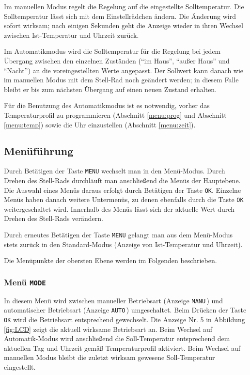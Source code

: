 \documentclass[a4paper]{article}
\begin{document}
Im manuellen Modus regelt die Regelung auf die eingestellte Solltemperatur.
Die Solltemperatur lässt sich mit dem Einstellrädchen ändern.  Die
Änderung wird sofort wirksam; nach einigen Sekunden geht die Anzeige
wieder in ihren Wechsel zwischen Ist-Temperatur und Uhrzeit zurück.

Im Automatikmodus wird die Solltemperatur für die Regelung bei jedem
Übergang zwischen den einzelnen Zuständen ("`im Haus"', "`außer Haus"'
und "`Nacht"') an die voreingestellten Werte angepasst.  Der Sollwert
kann danach wie im manuellen Modus mit dem Stell-Rad noch geändert
werden; in diesem Falle bleibt er bis zum nächsten Übergang auf einen
neuen Zustand erhalten.

Für die Benutzung des Automatikmodus ist es notwendig, vorher das
Temperaturprofil zu programmieren (Abschnitt \ref{menu:prog} und
Abschnitt \ref{menu:temp}) sowie die Uhr einzustellen (Abschnitt
\ref{menu:zeit}).

\subsection {
  Menüführung
}

Durch Betätigen der Taste \texttt{MENU} wechselt man in den
Menü-Modus.  Durch Drehen des Stell-Rads durchläuft man anschließend
die Menüs der Hauptebene.  Die Auswahl eines Menüs daraus erfolgt
durch Betätigen der Taste \texttt{OK}.  Einzelne Menüs haben danach
weitere Untermenüs, zu denen ebenfalls durch die Taste \texttt{OK}
weitergeschaltet wird.  Innerhalb des Menüs lässt sich der aktuelle
Wert durch Drehen des Stell-Rads verändern.

Durch erneutes Betätigen der Taste \texttt{MENU} gelangt man aus dem
Menü-Modus stets zurück in den Standard-Modus (Anzeige von
Ist-Temperatur und Uhrzeit).

Die Menüpunkte der obersten Ebene werden im Folgenden beschrieben.

\subsubsection {
  Menü \texttt{MODE}
}

In diesem Menü wird zwischen manueller Betriebsart (Anzeige
\texttt{MANU}\,) und automatischer Betriebsart (Anzeige \texttt{AUTO}\,)
umgeschaltet.  Beim Drücken der Taste \texttt{OK} wird die Betriebsart
entsprechend gewechselt.  Die Anzeige Nr. 5 in Abbildung \ref{fig:LCD} zeigt die
aktuell wirksame Betriebsart an.  Beim Wechsel auf Automatik-Modus
wird anschließend die Soll-Temperatur entsprechend dem aktuellen Tag
und Uhrzeit gemäß Temperaturprofil aktiviert.  Beim Wechsel auf
manuellen Modus bleibt die zuletzt wirksam gewesene Soll-Temperatur
eingestellt.
\end{document}
